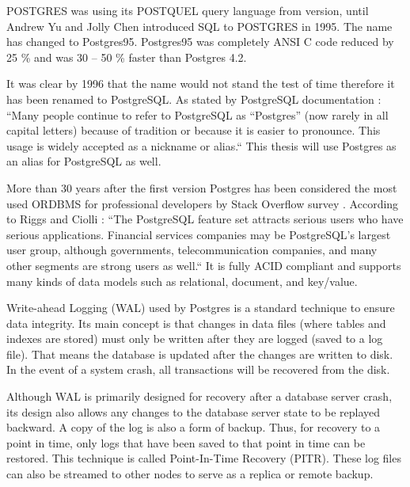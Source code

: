 POSTGRES was using its POSTQUEL query language from version, until Andrew Yu and Jolly Chen introduced SQL to POSTGRES in 1995. The name has changed to Postgres95. Postgres95 was completely ANSI C code reduced by 25 \% and was 30 – 50 \% faster than Postgres 4.2.  \cite{docuPgBriefHistory}

It was clear by 1996 that the name would not stand the test of time therefore it has been renamed to PostgreSQL. As stated by PostgreSQL documentation \cite{docuPgBriefHistory}: “Many people continue to refer to PostgreSQL as “Postgres” (now rarely in all capital letters) because of tradition or because it is easier to pronounce. This usage is widely accepted as a nickname or alias.“ This thesis will use Postgres as an alias for PostgreSQL as well.

More than 30 years after the first version Postgres has been considered the most used ORDBMS for professional developers by Stack Overflow survey \cite{so2022survey}. According to Riggs and Ciolli \cite{pg14introduction}: “The PostgreSQL feature set attracts serious users who have serious applications. Financial services companies may be PostgreSQL's largest user group, although governments, telecommunication companies, and many other segments are strong users as well.“ It is fully ACID compliant \cite{juba2015learningTransactionIsolation} and supports many kinds of data models such as relational, document, and key/value. \cite{pg14introduction}



Write-ahead Logging (WAL) used by Postgres is a standard technique to ensure data integrity. Its main concept is that changes in data files (where tables and indexes are stored) must only be written after they are logged (saved to a log file). That means the database is updated after the changes are written to disk. In the event of a system crash, all transactions will be recovered from the disk. \cite{docuPgWal}

Although WAL is primarily designed for recovery after a database server crash, its design also allows any changes to the database server state to be replayed backward. A copy of the log is also a form of backup. Thus, for recovery to a point in time, only logs that have been saved to that point in time can be restored. This technique is called Point-In-Time Recovery (PITR). \cite{DocuPgPITR} These log files can also be streamed to other nodes to serve as a replica or remote backup. \cite{pg14replication}

